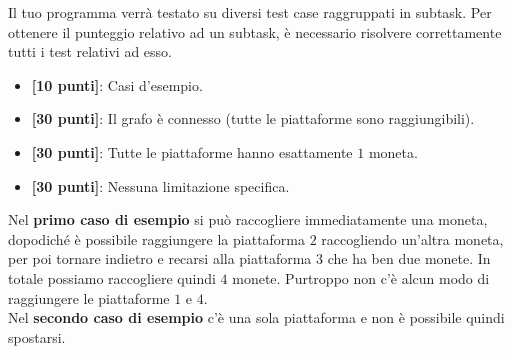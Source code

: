 \Scoring
Il tuo programma verrà testato su diversi test case raggruppati in subtask.
Per ottenere il punteggio relativo ad un subtask, è necessario risolvere
correttamente tutti i test relativi ad esso.

\begin{itemize}[nolistsep,itemsep=2mm]
  \item \textbf{ [10 punti]}: Casi d'esempio.
  \item \textbf{ [30 punti]}: Il grafo è connesso (tutte le piattaforme sono raggiungibili).
  \item \textbf{ [30 punti]}: Tutte le piattaforme hanno esattamente $1$ moneta.
  \item \textbf{ [30 punti]}: Nessuna limitazione specifica.
\end{itemize}



\Examples
\begin{example}
%
%
\end{example}


\Explanation
Nel \textbf{primo caso di esempio} si può raccogliere immediatamente una moneta, dopodiché è possibile raggiungere la piattaforma $2$ raccogliendo un'altra moneta, per poi tornare indietro e recarsi alla piattaforma $3$ che ha ben due monete. In totale possiamo raccogliere quindi $4$ monete. Purtroppo non c'è alcun modo di raggiungere le piattaforme $1$ e $4$.\\[2mm]
Nel \textbf{secondo caso di esempio} c'è una sola piattaforma e non è possibile quindi spostarsi.
